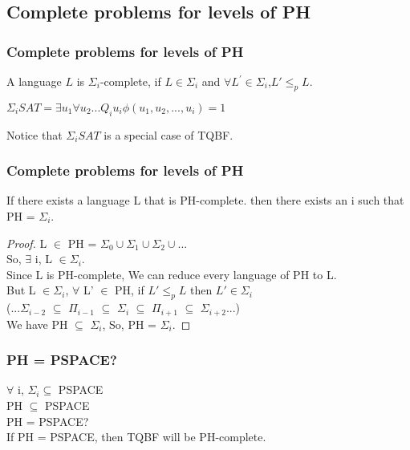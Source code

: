 \documentclass{beamer}
\begin{document}
\subsection{Complete problems for levels of PH}
\begin{frame}
\frametitle{Complete problems for levels of PH}
\begin{definition}
	A language $L$ is $\Sigma_{i}$-complete, if $L \in \Sigma_{i}$ and $\forall L^{'} \in \Sigma_{i}$,$L' \leq_{p} L$.
\end{definition}
\begin{example}
	$\Sigma_{i}SAT = \exists u_{1} \forall u_{2} ... Q_{i}u_{i} \phi (u_{1},u_{2},...,u_{i}) = 1$
\end{example}
Notice that 	$\Sigma_{i}SAT$ is a special case of TQBF.
\end{frame}
\begin{frame}
\frametitle{Complete problems for levels of PH}
\begin{theorem}
	If there exists a language L that is PH-complete. then there exists an i such that PH = $\Sigma_{i}$.
\end{theorem}
\begin{proof}
	L $\in$ PH = $\Sigma_{0} \cup \Sigma_{1} \cup \Sigma_{2} \cup ...$\\
	So, $\exists$ i, L $\in \Sigma_{i}$.\\
	Since L is PH-complete, We can reduce every language of PH to L.\\
	But L $\in \Sigma_{i}$, $\forall$ L' $\in$ PH, if $L' \leq_{p} L$ then $L' \in \Sigma_{i}$\\
	(...$\Sigma_{i-2}$ $\subseteq$ $\Pi_{i-1}$ $\subseteq$ $\Sigma_{i}$ $\subseteq$ $\Pi_{i+1}$ $\subseteq$ $\Sigma_{i+2}$...)\\
	We have PH $\subseteq$ $\Sigma_{i}$, So, PH = $\Sigma_{i}$.
\end{proof}
\end{frame}
\begin{frame}
\frametitle{PH = PSPACE?}
	$\forall$ i, $\Sigma_{i} \subseteq $ PSPACE\\
	PH $\subseteq$ PSPACE\\
	PH = PSPACE?\\
	If PH = PSPACE, then TQBF will be PH-complete.\\
	
\end{frame}
\end{document}
